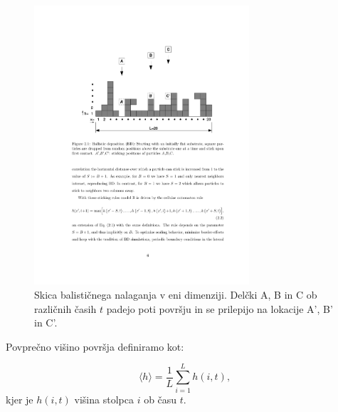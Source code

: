 \documentclass[a4paper, twoside, 12pt]{book}
\begin{document}
    \begin{figure}[h]
      \begin{center}
        \includegraphics[width=8cm]{slike/bdep}
      \end{center}
      \caption{Skica balističnega nalaganja v eni dimenziji. Delčki A, B in C ob različnih časih $t$ padejo poti površju in se prilepijo na lokacije A’, B’ in C’.}
      \label{fig:bdep}
    \end{figure}

Povprečno višino površja definiramo kot:

  \begin{equation}
    \langle h \rangle = \frac{1}{L} \sum_{i=1}^L h(i,t),
    \label{povprecna-visina}
  \end{equation}
kjer je $h(i,t)$ višina stolpca $i$ ob času $t$.
\end{document}
